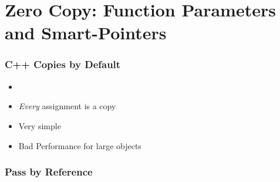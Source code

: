 \documentclass[usenames,dvipsnames,svgnames,table,aspectratio=169]{beamer}
\begin{document}


\section{Zero Copy: Function Parameters and Smart-Pointers}
\begin{frame}
    \frametitle{C++ Copies by Default}
    \begin{itemize}
        \item<+-> 
        \item<+-> \textit{Every} assignment is a copy
        \item<+-> Very simple
        \item<+-> Bad Performance for large objects
    \end{itemize}
\end{frame}

%    

%    

\begin{frame}
    \frametitle{Pass by Reference}
    
\end{frame}
\end{document}
